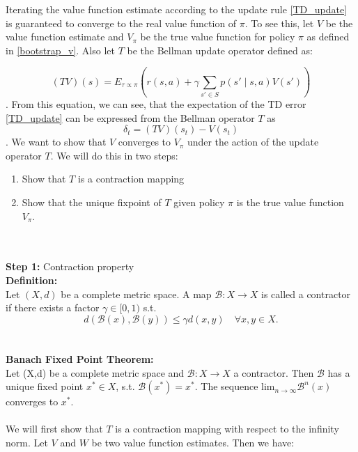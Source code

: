 Iterating the value function estimate according to the update rule \ref{TD_update} is guaranteed to converge to the real value function of $\pi$. To see this, 
let $V$ be the value function estimate and $V_{\pi}$ be the true value function for policy $\pi$ as defined in \ref{bootstrap_v}. Also let $T$ be the 
Bellman update operator defined as:

\begin{equation}
    (T V)(s) = E_{\tau \propto \pi} \left(r(s,a) + \gamma \sum_{s' \in S} p(s' \mid s,a) V(s')\right)
\end{equation}
. From this equation, we can see, that the expectation of the TD error \ref{TD_update} can be expressed from the Bellman operator $T$ as 
\begin{equation}
    \label{TD_update_BM}
    \delta_t = (T V)(s_t) - V(s_t)
\end{equation} 
. We want to show that $V$ converges to $V_{\pi}$ under the action of the update operator $T$. We will do this in two steps:
\begin{enumerate}
    \item Show that $T$ is a contraction mapping
    \item Show that the unique fixpoint of $T$ given policy $\pi$ is the true value function $V_{\pi}$.
\end{enumerate}
\\ \\

\textbf{Step 1:} Contraction property\\
\textbf{Definition:}\\
Let $(X, d)$ be a complete metric space. A map $\mathcal{B}:X \rightarrow X$ is called a contractor if there exists a factor $\gamma \in [0, 1)$ s.t.
\begin{equation}
    d(\mathcal{B}(x), \mathcal{B}(y)) \leq \gamma d(x,y) \quad \forall x,y \in X.
\end{equation}
\\ \\

\textbf{Banach Fixed Point Theorem:}\\
Let (X,d) be a complete metric space and $\mathcal{B}:X \rightarrow X$ a contractor. 
Then $\mathcal{B}$ has a unique fixed point $x^* \in X$, s.t. $\mathcal{B}(x^*) = x^*$. The sequence $\text{lim}_{n \rightarrow \infty}\mathcal{B}^n(x)$ converges to $x^*$.\\ \\

We will first show that $T$ is a contraction mapping with respect to the infinity norm. Let $V$ and $W$ be two value function estimates. Then we have:

